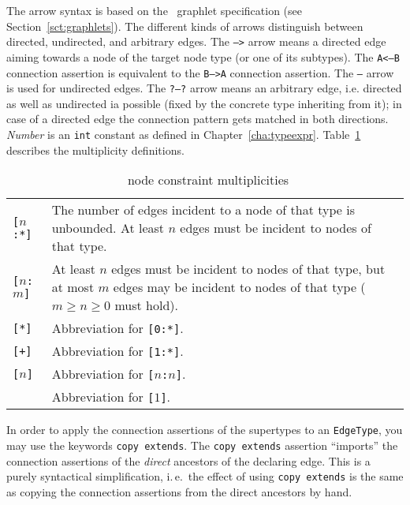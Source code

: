 The arrow syntax is based on the \GrG\ graphlet specification (see Section~\ref{sct:graphlets}).
The different kinds of arrows distinguish between directed, undirected, and arbitrary edges.
The \texttt{-->} arrow means a directed edge aiming towards a node of the target node type (or one of its subtypes).
The \texttt{A<--B} connection assertion is equivalent to the \texttt{B-->A} connection assertion.
The \texttt{--} arrow is used for undirected edges.
The \texttt{?--?} arrow means an arbitrary edge, i.e. directed as well as undirected ia possible (fixed by the concrete type inheriting from it); in case of a directed edge the connection pattern gets matched in both directions.
\emph{Number} is an \texttt{int} constant as defined in Chapter~\ref{cha:typeexpr}.
Table~\ref{multiplicities} describes the multiplicity definitions.

\begin{table}[htbp]
\begin{tabularx}{\linewidth}{|l|X|}\hline
	\texttt{[$n$:*]} & The number of edges incident to a node of that type is unbounded. At least $n$ edges must be incident to nodes of that type.\\
	\texttt{[$n$:$m$]} & At least $n$ edges must be incident to nodes of that type, but at most $m$ edges may be incident to nodes of that type ($m \geq n \geq 0$ must hold).\\
	\texttt{[*]} & Abbreviation for \texttt{[0:*]}.\\
	\texttt{[+]} & Abbreviation for \texttt{[1:*]}.\\
	\texttt{[$n$]} & Abbreviation for \texttt{[$n$:$n$]}.\\
	               & Abbreviation for \texttt{[$1$]}. \\ \hline
\end{tabularx}
\caption{\GrG\ node constraint multiplicities}
\label{multiplicities}
\end{table}

In order to apply the connection assertions of the supertypes to an \texttt{EdgeType}, you may use the keywords \texttt{copy extends}.
The \texttt{copy extends} assertion ``imports'' the connection assertions of the \emph{direct} ancestors of the declaring edge.
This is a purely syntactical simplification, i.\,e.\ the effect of using \texttt{copy extends} is the same as copying the connection assertions from the direct ancestors by hand.

